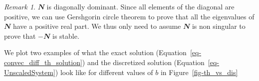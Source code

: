 \documentclass[
  letterpaper,
]{report}
\theoremstyle{plain}
\theoremstyle{definition}
\theoremstyle{definition}
\theoremstyle{remark}
\newtheorem*{remark}{Remark}
\begin{document}
\begin{remark}

\(\mathbfit{N}\) is diagonally dominant. Since all elements of the
diagonal are positive, we can use Gershgorin circle theorem to prove
that all the eigenvalues of \(\mathbfit{N}\) have a positive real part.
We thus only need to assume \(\mathbfit{N}\) is non singular to prove
that \(-\mathbfit{N}\) is stable.

\end{remark}

We plot two examples of what the exact solution
(Equation~\ref{eq-convec_diff_th_solution}) and the discretized solution
(Equation~\ref{eq-UnscaledSystem}) look like for different values of
\(b\) in Figure~\ref{fig-th_vs_dis}

\begin{figure}

\begin{minipage}[t]{0.50\linewidth}

{\centering 


}

\end{minipage}%
%
\begin{minipage}[t]{0.50\linewidth}

{\centering 

\raisebox{-\height}{

}}
\end{minipage}
\end{figure}
\end{document}

